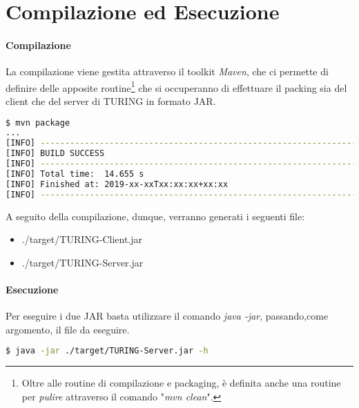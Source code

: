 \section{Compilazione ed Esecuzione}
\paragraph{Compilazione}
La compilazione viene gestita attraverso il toolkit \textit{Maven}, che ci permette di definire delle apposite routine\footnote{Oltre alle routine di compilazione e packaging, è definita anche una routine per \textit{pulire} attraverso il comando "\textit{mvn clean}".} che si occuperanno di effettuare il packing sia del client che del server di TURING in formato JAR.

\begin{lstlisting}[language=bash, caption="Compilazione tramite Maven"]
$ mvn package
...
[INFO] -------------------------------------------------------------------
[INFO] BUILD SUCCESS
[INFO] -------------------------------------------------------------------
[INFO] Total time:  14.655 s
[INFO] Finished at: 2019-xx-xxTxx:xx:xx+xx:xx
[INFO] -------------------------------------------------------------------
\end{lstlisting}
\pagebreak
A seguito della compilazione, dunque, verranno generati i seguenti file:
\begin{itemize}
	\item ./target/TURING-Client.jar
	\item ./target/TURING-Server.jar
\end{itemize}

\paragraph{Esecuzione}
Per eseguire i due JAR basta utilizzare il comando \textit{java -jar}, passando,come argomento, il file da eseguire.

\begin{lstlisting}[language=bash, caption="Esempio di esecuzione di TURING-Server.jar]
$ java -jar ./target/TURING-Server.jar -h
\end{lstlisting}

